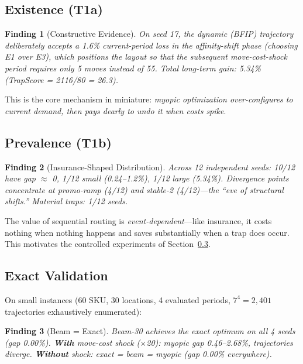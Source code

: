\documentclass[11pt,a4paper]{article}
\newtheorem{finding}{Finding}
\begin{document}
\subsection{Existence (T1a)}

\begin{finding}[Constructive Evidence]
On seed 17, the dynamic (BFIP) trajectory deliberately accepts a 1.6\%
current-period loss in the affinity-shift phase (choosing E1 over E3),
which positions the layout so that the subsequent move-cost-shock period
requires only 5 moves instead of 55. Total long-term gain: 5.34\%
(TrapScore = 2116/80 = 26.3).
\end{finding}

This is the core mechanism in miniature: \emph{myopic optimization
over-configures to current demand, then pays dearly to undo it when costs
spike}.

\subsection{Prevalence (T1b)}

\begin{finding}[Insurance-Shaped Distribution]
Across 12 independent seeds: 10/12 have gap $\approx$ 0, 1/12 small
(0.24--1.2\%), 1/12 large (5.34\%). Divergence points concentrate at
promo-ramp (4/12) and stable-2 (4/12)---the ``eve of structural shifts.''
Material traps: 1/12 seeds.
\end{finding}

The value of sequential routing is \emph{event-dependent}---like insurance,
it costs nothing when nothing happens and saves substantially when a trap
does occur. This motivates the controlled experiments of
Section~\ref{sec:controlled}.

\subsection{Exact Validation}\label{sec:controlled}

On small instances (60 SKU, 30 locations, 4 evaluated periods,
$7^4 = 2{,}401$ trajectories exhaustively enumerated):

\begin{finding}[Beam = Exact]
Beam-30 achieves the exact optimum on all 4 seeds (gap 0.00\%).
\textbf{With} move-cost shock ($\times$20): myopic gap 0.46--2.68\%,
trajectories diverge. \textbf{Without} shock: exact = beam = myopic
(gap 0.00\% everywhere).
\end{finding}
\end{document}
